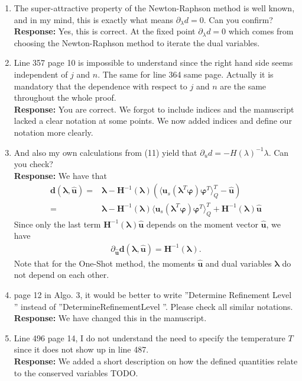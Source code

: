 \documentclass[11pt]{amsart}
\begin{document}
\begin{enumerate}
\item The super-attractive property of the Newton-Raphson method is well
known, and in my mind, this is exactly what means $\partial_{\lambda}d = 0$. Can you
confirm?
\\ \textbf{Response:} Yes, this is correct. At the fixed point $\partial_{\lambda}d = 0$ which comes from choosing the Newton-Raphson method to iterate the dual variables.
\item Line 357 page 10 is impossible to understand since the right hand side
seems independent of $j$ and $n$. The same for line 364 same page. Actually
it is mandatory that the dependence with respect to $j$ and $n$ are the same
throughout the whole proof.
\\ \textbf{Response:} You are correct. We forgot to include indices and the manuscript lacked a clear notation at some points. We now added indices and define our notation more clearly. 
\item And also my own calculations from (11) yield that $\partial_u d = -H(\lambda)^{-1}\lambda$. Can you check?
\\ \textbf{Response:} We have that
\begin{align*}
\bm d(\bm{\lambda},\bm{\hat u}) =& \bm{\lambda} - \bm{H}^{-1}(\bm\lambda)\left(\langle \bm u_s(\bm{\lambda}^T \bm\varphi)\bm\varphi^T\rangle_Q^T - \bm{\hat u}\right) \\
=& \bm{\lambda} - \bm{H}^{-1}(\bm\lambda)\langle \bm u_s(\bm{\lambda}^T \bm\varphi)\bm\varphi^T\rangle_Q^T +\bm{H}^{-1}(\bm\lambda) \bm{\hat u}
\end{align*}
Since only the last term $\bm{H}^{-1}(\bm\lambda) \bm{\hat u}$ depends on the moment vector $\bm{\hat u}$, we have
\begin{align*}
\partial_{\bm{\hat u}} \bm d(\bm{\lambda},\bm{\hat u}) = \bm{H}^{-1}(\bm\lambda).
\end{align*}
Note that for the One-Shot method, the moments $\bm{\hat u}$ and dual variables $\bm\lambda$ do not depend on each other.  
\item page 12 in Algo. 3, it would be better to write ”Determine Refinement
Level ” instead of ”DetermineRefinementLevel ”. Please check all similar
notations.
\\ \textbf{Response:} We have changed this in the manuscript.
\item Line 496 page 14, I do not understand the need to specify the temperature $T$ since it does not show up in line 487.
\\ \textbf{Response:} We added a short description on how the defined quantities relate to the conserved variables TODO.

\end{enumerate}
\end{document}
